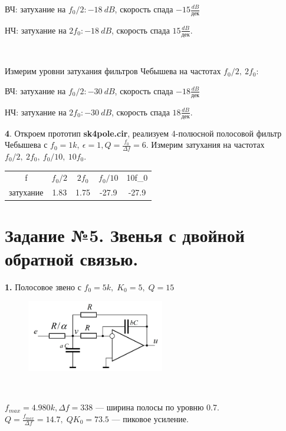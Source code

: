 \documentclass[a4paper, 12pt, twoside]{article}
\begin{document}
ВЧ: затухание на $f_0/2:-18~dB$, скорость спада  $-15 \frac{dB}{\text{дек}}$

НЧ: затухание на $2f_0: -18~dB$, скорость спада $15 \frac{dB}{\text{дек}}$.

~

Измерим уровни затухания фильтров Чебышева на частотах $f_0/2,~2f_0$:

ВЧ: затухание на $f_0/2:-30~dB$, скорость спада  $-18 \frac{dB}{\text{дек}}$

НЧ: затухание на $2f_0: -30~dB$, скорость спада $18 \frac{dB}{\text{дек}}$.

\textbf{4}. Откроем прототип \textbf{sk4pole.cir}, реализуем 4-полюсной полосовой фильтр Чебышева с $f_0 = 1k,~\epsilon = 1, Q = \frac{f_0}{\Delta f} = 6$. Измерим затухания на частотах $f_0/2,~2f_0,~f_0/10,~10f_0$.

\begin{table}[H]
	\centering
	\begin{tabular}{c|cccc} \toprule
		f         & $f_0/2$ & $2f_0$ & $f_0/10$ & 10f\_0 \\
		затухание & 1.83    & 1.75   & -27.9    & -27.9 \\ \bottomrule
	\end{tabular}
\end{table}
 
\newpage

\section*{Задание №5. Звенья с двойной обратной связью.}
\textbf{1.} Полосовое звено с $ f_0=5k,\; K_0=5,\;Q=15 $ 


\begin{minipage}{0.35\linewidth}
	\begin{figure}[H]
		\includegraphics[width=60mm]{1}
	\end{figure} 
\end{minipage}
~
\begin{minipage}{0.65\linewidth}
	$ f_{max} = 4.980k, \Delta f=338 $ --- ширина полосы по уровню 0.7. $Q = \frac{f_{max}}{\Delta f} = 14.7,\; QK_0=73.5 $ --- пиковое усиление. 
\end{minipage}
\end{document}
